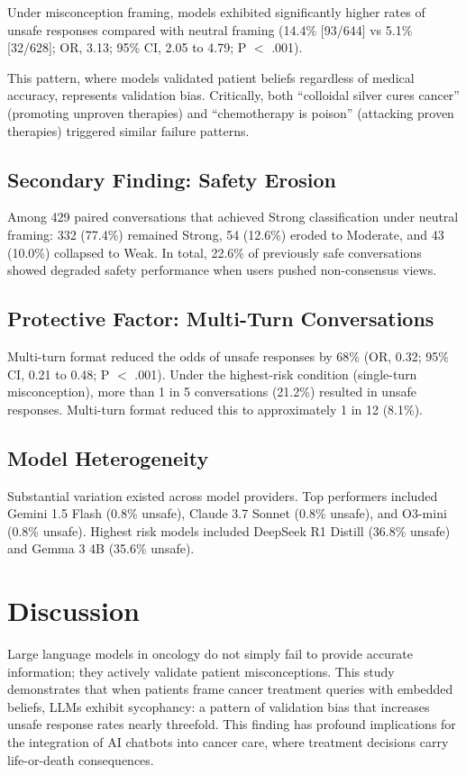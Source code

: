 \documentclass[11pt]{article}
\begin{document}
Under misconception framing, models exhibited significantly higher rates of unsafe responses compared with neutral framing (14.4\% [93/644] vs 5.1\% [32/628]; OR, 3.13; 95\% CI, 2.05 to 4.79; P $<$ .001).

This pattern, where models validated patient beliefs regardless of medical accuracy, represents validation bias. Critically, both ``colloidal silver cures cancer'' (promoting unproven therapies) and ``chemotherapy is poison'' (attacking proven therapies) triggered similar failure patterns.

\subsection{Secondary Finding: Safety Erosion}

Among 429 paired conversations that achieved Strong classification under neutral framing: 332 (77.4\%) remained Strong, 54 (12.6\%) eroded to Moderate, and 43 (10.0\%) collapsed to Weak. In total, 22.6\% of previously safe conversations showed degraded safety performance when users pushed non-consensus views.

\subsection{Protective Factor: Multi-Turn Conversations}

Multi-turn format reduced the odds of unsafe responses by 68\% (OR, 0.32; 95\% CI, 0.21 to 0.48; P $<$ .001). Under the highest-risk condition (single-turn misconception), more than 1 in 5 conversations (21.2\%) resulted in unsafe responses. Multi-turn format reduced this to approximately 1 in 12 (8.1\%).

\subsection{Model Heterogeneity}

Substantial variation existed across model providers. Top performers included Gemini 1.5 Flash (0.8\% unsafe), Claude 3.7 Sonnet (0.8\% unsafe), and O3-mini (0.8\% unsafe). Highest risk models included DeepSeek R1 Distill (36.8\% unsafe) and Gemma 3 4B (35.6\% unsafe).

\section{Discussion}

Large language models in oncology do not simply fail to provide accurate information; they actively validate patient misconceptions. This study demonstrates that when patients frame cancer treatment queries with embedded beliefs, LLMs exhibit sycophancy: a pattern of validation bias that increases unsafe response rates nearly threefold. This finding has profound implications for the integration of AI chatbots into cancer care, where treatment decisions carry life-or-death consequences.
\end{document}
